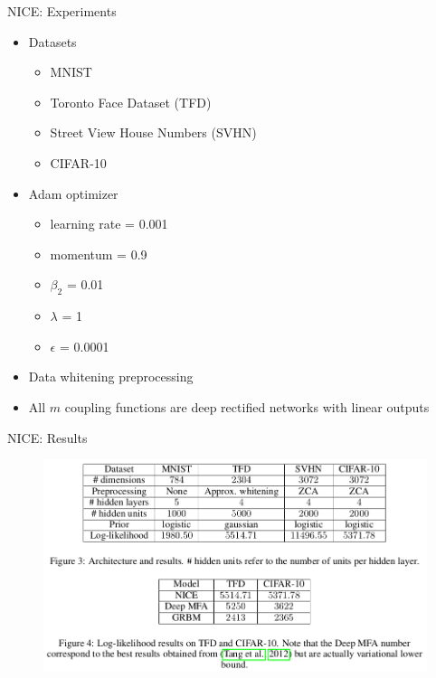 \begin{frame}{NICE: Experiments}
    \begin{itemize}
        \item Datasets
        \begin{itemize}
            \item MNIST
            \item Toronto Face Dataset (TFD)
            \item Street View House Numbers (SVHN)
            \item CIFAR-10
        \end{itemize}
        \item Adam optimizer
            \begin{itemize}
                \item learning rate = 0.001 
                \item momentum = 0.9 
                \item $\beta_2$ = 0.01 
                \item $\lambda$ = 1 
                \item $\epsilon$ = 0.0001 
            \end{itemize}
        \item Data whitening preprocessing
        \item All $m$ coupling functions are deep rectified networks with linear outputs
    \end{itemize}
\end{frame}
\begin{frame}{NICE: Results}
    \begin{figure}
        \centering
        \includegraphics[width=\textwidth]{Images/nice_experiments.png}
        \label{fig:nice_params_results}
    \end{figure}
\end{frame}
